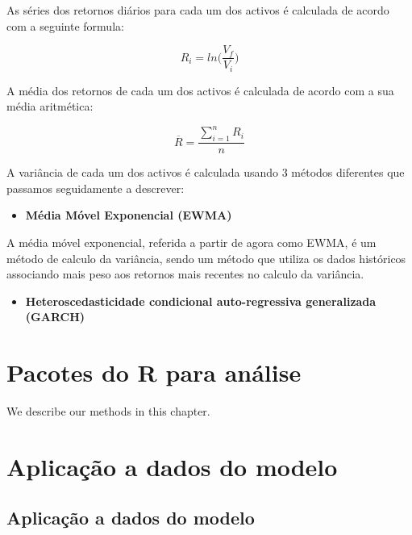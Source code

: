 \documentclass[
  12pt,
  brazil,
  a4paper,
  openany]{book}
\providecommand{\tightlist}{%
  \setlength{\itemsep}{0pt}\setlength{\parskip}{0pt}}
\begin{document}
As séries dos retornos diários para cada um dos activos é calculada de acordo com a seguinte formula:

\begin{equation} 
  R_i = ln\Big(\frac{V_f}{V_i}\Big)
  \label{eq:log}
\end{equation}

A média dos retornos de cada um dos activos é calculada de acordo com a sua média aritmética:

\begin{equation} 
  \overline{R} = \frac{\displaystyle\sum_{i=1}^n R_i}{n}
  \label{eq:mean}
\end{equation}

A variância de cada um dos activos é calculada usando 3 métodos diferentes que passamos seguidamente a descrever:

\begin{itemize}
\tightlist
\item
  \textbf{Média Móvel Exponencial (EWMA)}
\end{itemize}

A média móvel exponencial, referida a partir de agora como EWMA, é um método de calculo da variância, sendo um método que utiliza os dados históricos associando mais peso aos retornos mais recentes no calculo da variância.

\begin{itemize}
\tightlist
\item
  \textbf{Heteroscedasticidade condicional auto-regressiva generalizada (GARCH)}
\end{itemize}

\hypertarget{pacotes-do-r-para-anuxe1lise}{%
\chapter{Pacotes do R para análise}\label{pacotes-do-r-para-anuxe1lise}}

\newpage

We describe our methods in this chapter.

\hypertarget{aplicauxe7uxe3o-a-dados-do-modelo}{%
\chapter{Aplicação a dados do modelo}\label{aplicauxe7uxe3o-a-dados-do-modelo}}

\endgroup
\newpage

\hypertarget{aplicauxe7uxe3o-a-dados-do-modelo-1}{%
\section{Aplicação a dados do modelo}\label{aplicauxe7uxe3o-a-dados-do-modelo-1}}
\end{document}
